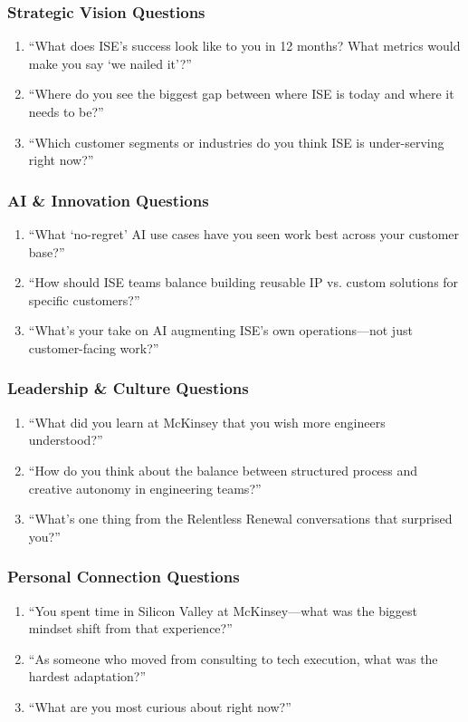 \documentclass[11pt,a4paper]{article}
\begin{document}
\subsubsection{Strategic Vision Questions}
\begin{enumerate}
    \item ``What does ISE's success look like to you in 12 months? What metrics would make you say `we nailed it'?''
    \item ``Where do you see the biggest gap between where ISE is today and where it needs to be?''
    \item ``Which customer segments or industries do you think ISE is under-serving right now?''
\end{enumerate}

\subsubsection{AI \& Innovation Questions}
\begin{enumerate}
    \item ``What `no-regret' AI use cases have you seen work best across your customer base?''
    \item ``How should ISE teams balance building reusable IP vs. custom solutions for specific customers?''
    \item ``What's your take on AI augmenting ISE's own operations---not just customer-facing work?''
\end{enumerate}

\subsubsection{Leadership \& Culture Questions}
\begin{enumerate}
    \item ``What did you learn at McKinsey that you wish more engineers understood?''
    \item ``How do you think about the balance between structured process and creative autonomy in engineering teams?''
    \item ``What's one thing from the Relentless Renewal conversations that surprised you?''
\end{enumerate}

\subsubsection{Personal Connection Questions}
\begin{enumerate}
    \item ``You spent time in Silicon Valley at McKinsey---what was the biggest mindset shift from that experience?''
    \item ``As someone who moved from consulting to tech execution, what was the hardest adaptation?''
    \item ``What are you most curious about right now?''
\end{enumerate}
\end{document}
